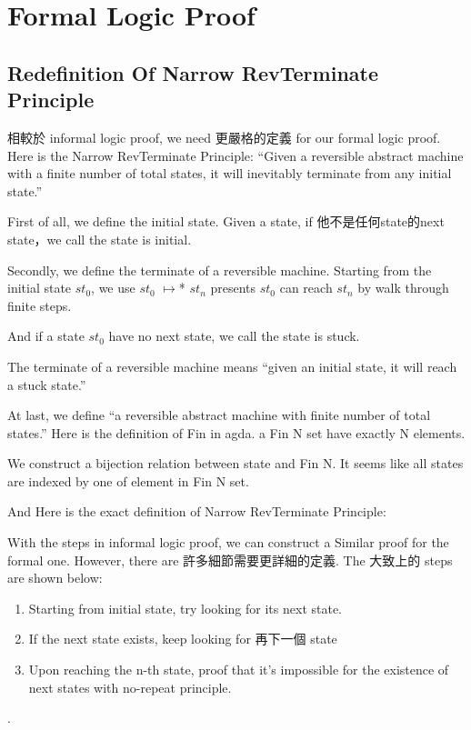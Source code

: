 \section{Formal Logic Proof}

\subsection{ Redefinition Of Narrow RevTerminate Principle}
相較於 informal logic proof, we need 更嚴格的定義 for our formal logic proof.
Here is the Narrow RevTerminate Principle:
``Given a reversible abstract machine with a finite number of total states, it will inevitably terminate from any initial state.''

First of all, we define the initial state.  Given a state, if 他不是任何state的next state，we call the state is initial.


Secondly, we define the terminate of a reversible machine.
Starting from the initial state $st_{0}$, we use $st_{0}$ $\mapsto$* $st_{n}$ presents $st_{0}$ can reach $st_{n}$ by walk through finite steps.


And if a state $st_{0}$ have no next state, we call the state is stuck.


The terminate of a reversible machine means ``given an initial state, it will reach a stuck state.''


At last, we define ``a reversible abstract machine with finite number of total states.''
Here is the definition of Fin in agda.  a Fin N set have exactly N elements.


We construct a bijection relation between state and Fin N.
It seems like all states are indexed by one of element in Fin N set.


And Here is the exact definition of Narrow RevTerminate Principle:




With the steps in informal logic proof, we can construct a Similar proof for the formal one.  However, there are 許多細節需要更詳細的定義.
The 大致上的 steps are shown below:
\begin{enumerate}[1.]
\item Starting from initial state, try looking for its next state. 
\item If the next state exists, keep looking for 再下一個 state
\item Upon reaching the n-th state, proof that it's impossible for the existence of next states with no-repeat principle.
\end{enumerate}.

